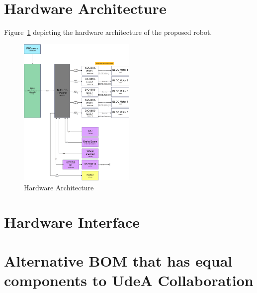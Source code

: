 \documentclass[a4paper,8pt]{article}
\begin{document}
  \section{Hardware Architecture}

  Figure\Figure~\ref{fig:hardware_architecture} depicting the hardware
  architecture of the proposed robot.

  \begin{figure}[H]
    \begin{center}
      \includegraphics[width=0.5\textwidth]{Hardware_architecture.png}
    \end{center}
    \caption{Hardware Architecture}
    \label{fig:hardware_architecture}
  \end{figure}

  \section{Hardware Interface}

  \section{Alternative BOM that has equal components to UdeA
    Collaboration}
\end{document}
